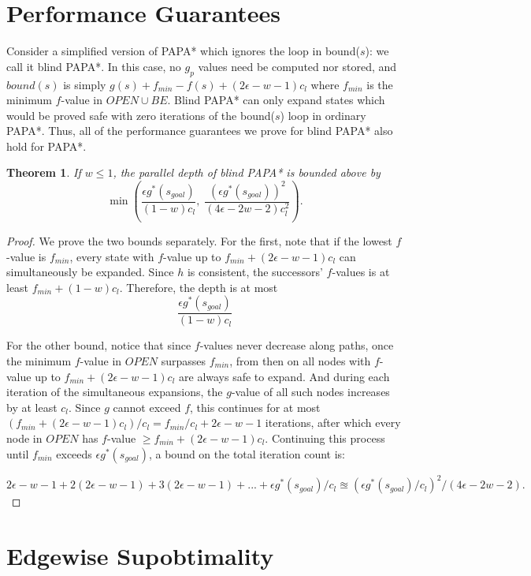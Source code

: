 \documentclass[letterpaper]{article}
\newtheorem{thm}{Theorem}
\begin{document}
\section{Performance Guarantees}

Consider a simplified version of PAPA* which ignores the loop in bound($s$): we call it blind PAPA*. In this case, no $g_p$ values need be computed nor stored, and $bound(s)$ is simply $g(s) + f_{min} - f(s) + (2\epsilon-w-1)c_l$ where $f_{min}$ is the minimum $f$-value in $OPEN \cup BE$. Blind PAPA* can only expand states which would be proved safe with zero iterations of the bound($s$) loop in ordinary PAPA*. Thus, all of the performance guarantees we prove for blind PAPA* also hold for PAPA*. 

\begin{thm}
\label{thm:depth}
If $w \le 1$, the parallel depth of blind PAPA* is bounded above by
\[\min\left(\frac{\epsilon g^*(s_{goal})}{(1-w)c_l},\;
\frac{\left(\epsilon g^*(s_{goal})\right)^2 }{(4\epsilon-2w-2)c_l^2}\right).\]
\end{thm}

\begin{proof}
We prove the two bounds separately. For the first, note that if the lowest $f$-value is $f_{min}$, every state with $f$-value up to $f_{min} + (2\epsilon-w-1)c_l$ can simultaneously be expanded. Since $h$ is consistent, the successors' $f$-values is at least $f_{min} + (1-w)c_l$. Therefore, the depth is at most
\[\frac{\epsilon g^*(s_{goal})}{(1-w)c_l}\]

For the other bound, notice that since $f$-values never decrease along paths, once the minimum $f$-value in $OPEN$ surpasses $f_{min}$, from then on all nodes with $f$-value up to $f_{min} + (2\epsilon-w-1)c_l$ are always safe to expand. And during each iteration of the simultaneous expansions, the $g$-value of all such nodes increases by at least $c_l$. Since $g$ cannot exceed $f$, this continues for at most $(f_{min} + (2\epsilon-w-1)c_l) / c_l = f_{min}/c_l + 2\epsilon-w-1$ iterations, after which every node in $OPEN$ has $f$-value $\ge f_{min} + (2\epsilon-w-1)c_l$. Continuing this process until $f_{min}$ exceeds $\epsilon g^*(s_{goal})$, a bound on the total iteration count is:

$2\epsilon-w-1 + 2(2\epsilon-w-1) + 3(2\epsilon-w-1) + ... + \epsilon g^*(s_{goal})/c_l
\approxeq (\epsilon g^*(s_{goal})/c_l )^2 / ( 4\epsilon-2w-2 ).$
\end{proof}

\section{Edgewise Supobtimality}
\end{document}
